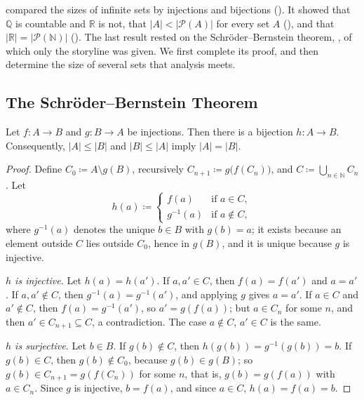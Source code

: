 compared the sizes of infinite sets by injections and bijections (). It showed that $\mathbb Q$ is countable and $\mathbb R$ is not, that $|A|<|\mathcal P(A)|$ for every set $A$ (), and that $|\mathbb R|=|\mathcal P(\mathbb N)|$ (). The last result rested on the Schr\"oder--Bernstein theorem, , of which only the storyline was given. We first complete its proof, and then determine the size of several sets that analysis meets.

\subsection{The Schr\"oder--Bernstein Theorem}

\begin{theorem}
\label{thm:schroeder-bernstein-full}
Let $f\colon A\to B$ and $g\colon B\to A$ be injections. Then there is a bijection $h\colon A\to B$. Consequently, $|A|\le|B|$ and $|B|\le|A|$ imply $|A|=|B|$.
\end{theorem}

\begin{proof}
Define $C_0\coloneqq A\setminus g(B)$, recursively $C_{n+1}\coloneqq g\bigl(f(C_n)\bigr)$, and $C\coloneqq\bigcup_{n\in\mathbb N}C_n$. Let
\[
h(a)\coloneqq\begin{cases}f(a)&\text{if }a\in C,\\ g^{-1}(a)&\text{if }a\notin C,\end{cases}
\]
where $g^{-1}(a)$ denotes the unique $b\in B$ with $g(b)=a$; it exists because an element outside $C$ lies outside $C_0$, hence in $g(B)$, and it is unique because $g$ is injective.

\emph{$h$ is injective.} Let $h(a)=h(a')$. If $a,a'\in C$, then $f(a)=f(a')$ and $a=a'$. If $a,a'\notin C$, then $g^{-1}(a)=g^{-1}(a')$, and applying $g$ gives $a=a'$. If $a\in C$ and $a'\notin C$, then $f(a)=g^{-1}(a')$, so $a'=g(f(a))$; but $a\in C_n$ for some $n$, and then $a'\in C_{n+1}\subseteq C$, a contradiction. The case $a\notin C$, $a'\in C$ is the same.

\emph{$h$ is surjective.} Let $b\in B$. If $g(b)\notin C$, then $h(g(b))=g^{-1}(g(b))=b$. If $g(b)\in C$, then $g(b)\notin C_0$, because $g(b)\in g(B)$; so $g(b)\in C_{n+1}=g(f(C_n))$ for some $n$, that is, $g(b)=g(f(a))$ with $a\in C_n$. Since $g$ is injective, $b=f(a)$, and since $a\in C$, $h(a)=f(a)=b$.
\end{proof}

